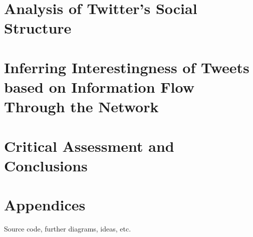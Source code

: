 \chapter{Analysis of Twitter's Social Structure}


\chapter{Inferring Interestingness of Tweets based on Information Flow Through the Network}


\chapter{Critical Assessment and Conclusions}


%
%
%

\chapter*{Appendices}
Source code, further diagrams, ideas, etc.


\backmatter

\def\baselinestretch{1.24}\normalfont





